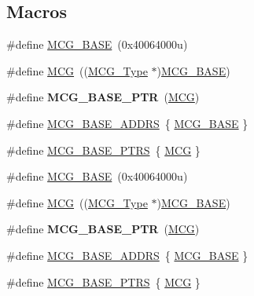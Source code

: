 \subsection*{Macros}
\begin{DoxyCompactItemize}
\item 
\#define \hyperlink{group__MCG__Peripheral__Access__Layer_gaad20a4618a24bbbb2edab9643eb6db29}{M\+C\+G\+\_\+\+B\+A\+SE}~(0x40064000u)
\item 
\#define \hyperlink{group__MCG__Peripheral__Access__Layer_gad7ea2d93cafdbe9298ef1dd52be44f88}{M\+CG}~((\hyperlink{structMCG__Type}{M\+C\+G\+\_\+\+Type} $\ast$)\hyperlink{group__MCG__Peripheral__Access__Layer_gaad20a4618a24bbbb2edab9643eb6db29}{M\+C\+G\+\_\+\+B\+A\+SE})
\item 
\#define {\bfseries M\+C\+G\+\_\+\+B\+A\+S\+E\+\_\+\+P\+TR}~(\hyperlink{group__MCG__Peripheral__Access__Layer_gad7ea2d93cafdbe9298ef1dd52be44f88}{M\+CG})\hypertarget{group__MCG__Peripheral__Access__Layer_gaceefc72e93a47a35f59a31c57dddf41b}{}\label{group__MCG__Peripheral__Access__Layer_gaceefc72e93a47a35f59a31c57dddf41b}

\item 
\#define \hyperlink{group__MCG__Peripheral__Access__Layer_gab7ba0907fd63f1e70dddac601e4f9dd9}{M\+C\+G\+\_\+\+B\+A\+S\+E\+\_\+\+A\+D\+D\+RS}~\{ \hyperlink{group__MCG__Peripheral__Access__Layer_gaad20a4618a24bbbb2edab9643eb6db29}{M\+C\+G\+\_\+\+B\+A\+SE} \}
\item 
\#define \hyperlink{group__MCG__Peripheral__Access__Layer_ga3e6aec328b7327acc1f7bff70bec388c}{M\+C\+G\+\_\+\+B\+A\+S\+E\+\_\+\+P\+T\+RS}~\{ \hyperlink{group__MCG__Peripheral__Access__Layer_gad7ea2d93cafdbe9298ef1dd52be44f88}{M\+CG} \}
\item 
\#define \hyperlink{group__MCG__Peripheral__Access__Layer_gaad20a4618a24bbbb2edab9643eb6db29}{M\+C\+G\+\_\+\+B\+A\+SE}~(0x40064000u)
\item 
\#define \hyperlink{group__MCG__Peripheral__Access__Layer_gad7ea2d93cafdbe9298ef1dd52be44f88}{M\+CG}~((\hyperlink{structMCG__Type}{M\+C\+G\+\_\+\+Type} $\ast$)\hyperlink{group__MCG__Peripheral__Access__Layer_gaad20a4618a24bbbb2edab9643eb6db29}{M\+C\+G\+\_\+\+B\+A\+SE})
\item 
\#define {\bfseries M\+C\+G\+\_\+\+B\+A\+S\+E\+\_\+\+P\+TR}~(\hyperlink{group__MCG__Peripheral__Access__Layer_gad7ea2d93cafdbe9298ef1dd52be44f88}{M\+CG})\hypertarget{group__MCG__Peripheral__Access__Layer_gaceefc72e93a47a35f59a31c57dddf41b}{}\label{group__MCG__Peripheral__Access__Layer_gaceefc72e93a47a35f59a31c57dddf41b}

\item 
\#define \hyperlink{group__MCG__Peripheral__Access__Layer_gab7ba0907fd63f1e70dddac601e4f9dd9}{M\+C\+G\+\_\+\+B\+A\+S\+E\+\_\+\+A\+D\+D\+RS}~\{ \hyperlink{group__MCG__Peripheral__Access__Layer_gaad20a4618a24bbbb2edab9643eb6db29}{M\+C\+G\+\_\+\+B\+A\+SE} \}
\item 
\#define \hyperlink{group__MCG__Peripheral__Access__Layer_ga3e6aec328b7327acc1f7bff70bec388c}{M\+C\+G\+\_\+\+B\+A\+S\+E\+\_\+\+P\+T\+RS}~\{ \hyperlink{group__MCG__Peripheral__Access__Layer_gad7ea2d93cafdbe9298ef1dd52be44f88}{M\+CG} \}
\end{DoxyCompactItemize}
